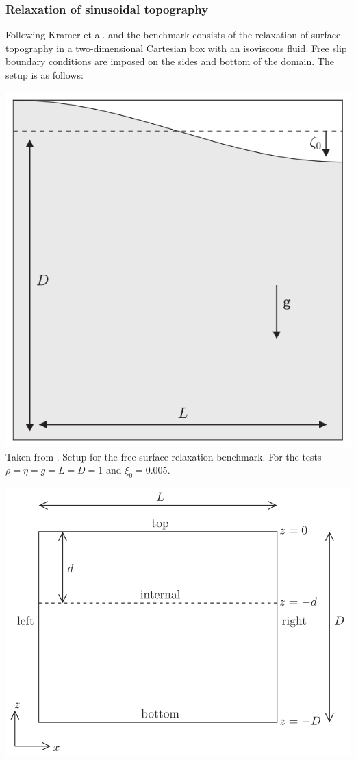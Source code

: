 \subsubsection{Relaxation of sinusoidal topography}

Following Kramer et al. \cite[Section 3.1.1]{krwd12} and \cite{robh17} 
the benchmark consists of the relaxation of surface topography in a 
two-dimensional Cartesian box with an isoviscous fluid. 
Free slip boundary conditions are imposed on the sides and bottom of the domain.
The setup is as follows:

\begin{center}
\begin{minipage}{0.45\textwidth}
\centering
\includegraphics[height=0.8\textwidth]{images/benchmark_relaxation/robh17}\\
{\captionfont Taken from \cite{robh17}. Setup for the free surface relaxation benchmark.
For the tests $\rho=\eta=g=L=D=1$ and $\xi_0=0.005$.}
\end{minipage}\hfill
\begin{minipage}{0.45\textwidth}
\centering
\includegraphics[height=0.8\textwidth]{images/benchmark_relaxation/krwd12}\\

\end{minipage}
\end{center}
